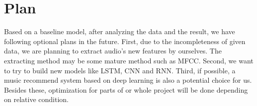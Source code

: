 \documentclass{article}
\begin{document}
\section{Plan}
Based on a baseline model, after analyzing the data and the result, we have following optional plans in the future. First, due to the incompleteness of given data, we are planning to extract audio's new features by ourselves. The extracting method may be some mature method such as MFCC. Second, we want to try to build new models like LSTM, CNN and RNN. Third, if possible, a music recommend system based on deep learning is also a potential choice for us. Besides these, optimization for parts of or whole project will be done depending on relative condition. 


\end{document}

